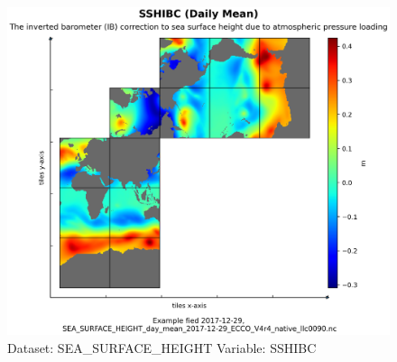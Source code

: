 \begin{figure}[H]
\centering
\includegraphics[scale=0.55]{../images/plots/native_plots/Sea_Surface_Height/SSHIBC.png}
\caption{Dataset: SEA\_SURFACE\_HEIGHT Variable: SSHIBC}
\label{tab:table-SEA_SURFACE_HEIGHT_SSHIBC-Plot}
\end{figure}
\pagebreak
